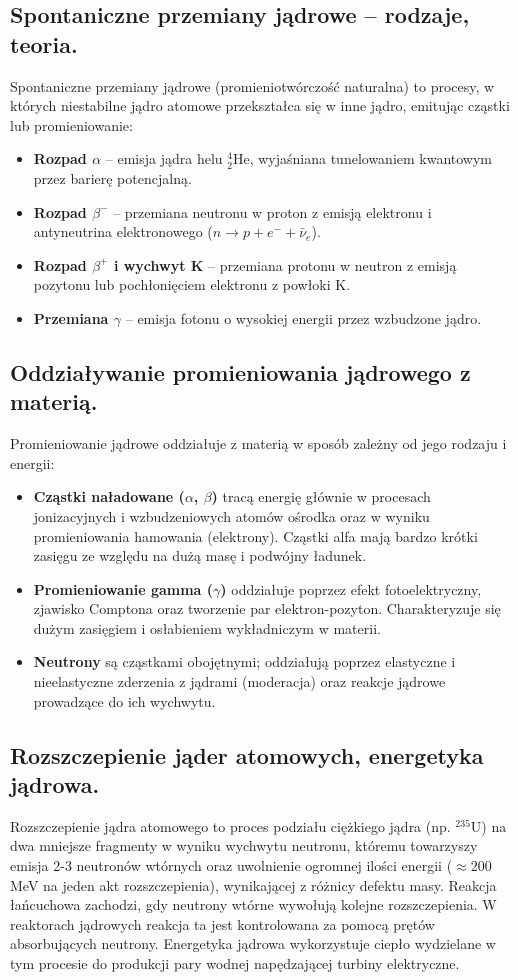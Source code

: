 \documentclass[11pt,a4paper]{article}
\begin{document}
\subsection{Spontaniczne przemiany jądrowe -- rodzaje, teoria.}
Spontaniczne przemiany jądrowe (promieniotwórczość naturalna) to procesy, w których niestabilne jądro atomowe przekształca się w inne jądro, emitując cząstki lub promieniowanie:
\begin{itemize}
    \item \textbf{Rozpad $\alpha$} -- emisja jądra helu ${}^4_2\text{He}$, wyjaśniana tunelowaniem kwantowym przez barierę potencjalną.
    \item \textbf{Rozpad $\beta^-$} -- przemiana neutronu w proton z emisją elektronu i antyneutrina elektronowego ($n \to p + e^- + \bar{\nu}_e$).
    \item \textbf{Rozpad $\beta^+$ i wychwyt K} -- przemiana protonu w neutron z emisją pozytonu lub pochłonięciem elektronu z powłoki K.
    \item \textbf{Przemiana $\gamma$} -- emisja fotonu o wysokiej energii przez wzbudzone jądro.
\end{itemize}

\subsection{Oddziaływanie promieniowania jądrowego z materią.}
Promieniowanie jądrowe oddziałuje z materią w sposób zależny od jego rodzaju i energii:
\begin{itemize}
    \item \textbf{Cząstki naładowane ($\alpha$, $\beta$)} tracą energię głównie w procesach jonizacyjnych i wzbudzeniowych atomów ośrodka oraz w wyniku promieniowania hamowania (elektrony). Cząstki alfa mają bardzo krótki zasięgu ze względu na dużą masę i podwójny ładunek.
    \item \textbf{Promieniowanie gamma ($\gamma$)} oddziałuje poprzez efekt fotoelektryczny, zjawisko Comptona oraz tworzenie par elektron-pozyton. Charakteryzuje się dużym zasięgiem i osłabieniem wykładniczym w materii.
    \item \textbf{Neutrony} są cząstkami obojętnymi; oddziałują poprzez elastyczne i nieelastyczne zderzenia z jądrami (moderacja) oraz reakcje jądrowe prowadzące do ich wychwytu.
\end{itemize}

\subsection{Rozszczepienie jąder atomowych, energetyka jądrowa.}
Rozszczepienie jądra atomowego to proces podziału ciężkiego jądra (np. ${}^{235}\text{U}$) na dwa mniejsze fragmenty w wyniku wychwytu neutronu, któremu towarzyszy emisja 2-3 neutronów wtórnych oraz uwolnienie ogromnej ilości energii ($\approx 200$ MeV na jeden akt rozszczepienia), wynikającej z różnicy defektu masy. Reakcja łańcuchowa zachodzi, gdy neutrony wtórne wywołują kolejne rozszczepienia. W reaktorach jądrowych reakcja ta jest kontrolowana za pomocą prętów absorbujących neutrony. Energetyka jądrowa wykorzystuje ciepło wydzielane w tym procesie do produkcji pary wodnej napędzającej turbiny elektryczne.
\end{document}
